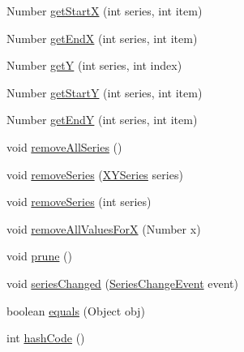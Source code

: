 \begin{DoxyCompactItemize}
Number \mbox{\hyperlink{classorg_1_1jfree_1_1data_1_1xy_1_1_default_table_x_y_dataset_a19b5ac6d388445218c7f0a2cdf2a29af}{get\+StartX}} (int series, int item)
\item 
Number \mbox{\hyperlink{classorg_1_1jfree_1_1data_1_1xy_1_1_default_table_x_y_dataset_a12b2af8de53dfdcd8fec99d1c1b304b2}{get\+EndX}} (int series, int item)
\item 
Number \mbox{\hyperlink{classorg_1_1jfree_1_1data_1_1xy_1_1_default_table_x_y_dataset_a14d79167e9baad0df8490dc6e357e791}{getY}} (int series, int index)
\item 
Number \mbox{\hyperlink{classorg_1_1jfree_1_1data_1_1xy_1_1_default_table_x_y_dataset_ad447b9f576948e9b3e7d4ba78c848558}{get\+StartY}} (int series, int item)
\item 
Number \mbox{\hyperlink{classorg_1_1jfree_1_1data_1_1xy_1_1_default_table_x_y_dataset_ae0d28b2da1af879209a1c47c07ab3141}{get\+EndY}} (int series, int item)
\item 
void \mbox{\hyperlink{classorg_1_1jfree_1_1data_1_1xy_1_1_default_table_x_y_dataset_ae9eefce46d204d45b77d2127aa41a781}{remove\+All\+Series}} ()
\item 
void \mbox{\hyperlink{classorg_1_1jfree_1_1data_1_1xy_1_1_default_table_x_y_dataset_ae887a8123f06f2f901845e762e5b904e}{remove\+Series}} (\mbox{\hyperlink{classorg_1_1jfree_1_1data_1_1xy_1_1_x_y_series}{X\+Y\+Series}} series)
\item 
void \mbox{\hyperlink{classorg_1_1jfree_1_1data_1_1xy_1_1_default_table_x_y_dataset_ae0872bbfef35badbd753df318e82b91a}{remove\+Series}} (int series)
\item 
void \mbox{\hyperlink{classorg_1_1jfree_1_1data_1_1xy_1_1_default_table_x_y_dataset_a6da2fda677c2e8fe489cc3726492ceae}{remove\+All\+Values\+ForX}} (Number x)
\item 
void \mbox{\hyperlink{classorg_1_1jfree_1_1data_1_1xy_1_1_default_table_x_y_dataset_a0026128bf1bcfb30f61ef55a4390a23d}{prune}} ()
\item 
void \mbox{\hyperlink{classorg_1_1jfree_1_1data_1_1xy_1_1_default_table_x_y_dataset_ad55c61c1cd535e757c2542daf8c36808}{series\+Changed}} (\mbox{\hyperlink{classorg_1_1jfree_1_1data_1_1general_1_1_series_change_event}{Series\+Change\+Event}} event)
\item 
boolean \mbox{\hyperlink{classorg_1_1jfree_1_1data_1_1xy_1_1_default_table_x_y_dataset_abf263751a023a3c112efb013d0cbfb42}{equals}} (Object obj)
\item 
int \mbox{\hyperlink{classorg_1_1jfree_1_1data_1_1xy_1_1_default_table_x_y_dataset_ab97163d6044f6ec8708f91a16d0191ff}{hash\+Code}} ()

\end{DoxyCompactItemize}
